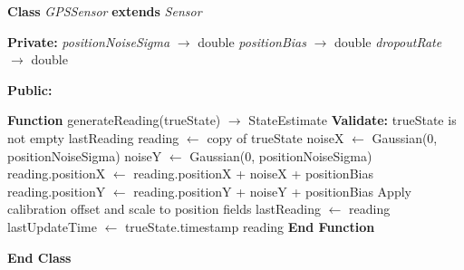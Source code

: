 \documentclass[a4paper,11pt]{article}
\begin{document}
\begin{algorithm}[H]
\caption{GPSSensor::generateReading   Subclass Override with Signal Dropout}
\begin{algorithmic}[1]

\State \textbf{Class} \textit{GPSSensor} \textbf{extends} \textit{Sensor}

\State \hspace{0.5cm} \textbf{Private:}
\State \hspace{1cm} \textit{positionNoiseSigma} $\rightarrow$ double
\State \hspace{1cm} \textit{positionBias} $\rightarrow$ double
\State \hspace{1cm} \textit{dropoutRate} $\rightarrow$ double 

\State \hspace{0.5cm} \textbf{Public:}

\State \hspace{1cm} \textbf{Function} generateReading(trueState) $\rightarrow$ StateEstimate
\State \hspace{1.5cm} \textbf{Validate:} trueState is not empty
\State \hspace{1.5cm} 
\State \hspace{2cm} \Return lastReading 
\State \hspace{1.5cm} \EndIf
\State \hspace{1.5cm} reading $\leftarrow$ copy of trueState
\State \hspace{1.5cm} noiseX $\leftarrow$ Gaussian(0, positionNoiseSigma)
\State \hspace{1.5cm} noiseY $\leftarrow$ Gaussian(0, positionNoiseSigma)
\State \hspace{1.5cm} reading.positionX $\leftarrow$ reading.positionX + noiseX + positionBias
\State \hspace{1.5cm} reading.positionY $\leftarrow$ reading.positionY + noiseY + positionBias
\State \hspace{1.5cm} 
\State \hspace{2cm} Apply calibration offset and scale to position fields
\State \hspace{1.5cm} \EndIf
\State \hspace{1.5cm} lastReading $\leftarrow$ reading
\State \hspace{1.5cm} lastUpdateTime $\leftarrow$ trueState.timestamp
\State \hspace{1.5cm} \Return reading
\State \hspace{1cm} \textbf{End Function}

\State \textbf{End Class}

\end{algorithmic}
\end{algorithm}
\end{document}
